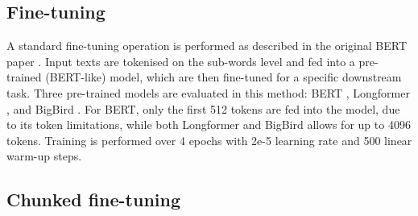 \subsection{Fine-tuning}

A standard fine-tuning operation is performed as described in the original BERT paper \cite{devlin-2019-bert}. Input texts are tokenised on the sub-words level and fed into a pre-trained (BERT-like) model, which are then fine-tuned for a specific downstream task. Three pre-trained models are evaluated in this method: BERT \cite{devlin-2019-bert}, Longformer \cite{beltagy-2020-longformer}, and BigBird \cite{zaheer-2021-bigbird}. For BERT, only the first 512 tokens are fed into the model, due to its token limitations, while both Longformer and BigBird allows for up to 4096 tokens. Training is performed over 4 epochs with 2e-5 learning rate and 500 linear warm-up steps.

\subsection{Chunked fine-tuning}

